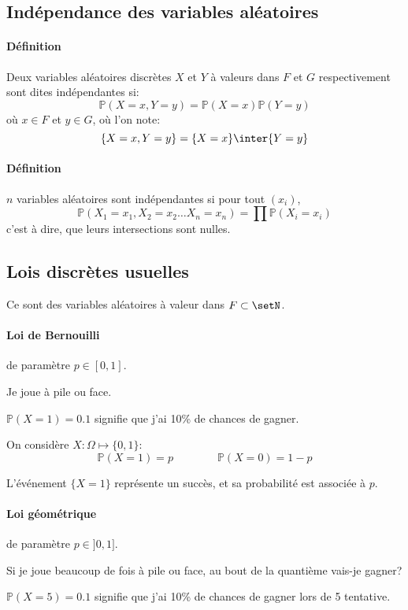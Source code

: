 \documentclass[a4paper,10pt,french,openany]{memoir}
\newcommand{\Proba}{\mathbb{P}}
\begin{document}
\subsection{Indépendance des variables aléatoires}

\paragraph{Définition}
Deux variables aléatoires discrètes $X$ et $Y$ à valeurs dans $F$ et $G$ respectivement sont dites indépendantes si:
\[ \Proba(X=x, Y=y)=\Proba(X=x) \Proba(Y=y) \]
où $x\in F$ et $y \in G$, où l'on note:
\[ \{X=x, Y=y\}=\{X=x\}\inter\{Y=y\} \]

\paragraph{Définition}
$n$ variables aléatoires sont indépendantes si pour tout $(x_i)$, \[\Proba(X_1=x_1, X_2=x_2\dots X_n=x_n) = \prod \Proba(X_i=x_i)\]
c'est à dire, que leurs intersections sont nulles.

\subsection{Lois discrètes usuelles}

Ce sont des variables aléatoires à valeur dans $F \subset \setN$.

\paragraph{Loi de Bernouilli} de paramètre $p \in [0,1]$.

\begin{cquote}{}
Je joue à pile ou face.

$\Proba(X=1) = 0.1$ signifie que j'ai 10\% de chances de gagner.
\end{cquote}

On considère $X: \Omega \mapsto \{0,1\}$:
\[ \Proba(X=1)=p \qquad\qquad \Proba(X=0)=1-p \]

L'événement $\{X=1\}$ représente un succès, et sa probabilité est associée à $p$.

\paragraph{Loi géométrique} de paramètre $p \in ]0,1]$.

\begin{cquote}{}
Si je joue beaucoup de fois à pile ou face, au bout de la quantième vais-je gagner?

$\Proba(X=5)=0.1$ signifie que j'ai 10\% de chances de gagner lors de 5\ieme{} tentative.
\end{cquote}
\end{document}
